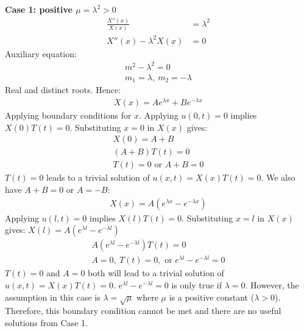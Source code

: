 \documentclass[11pt]{article}
\numberwithin{equation}{section}
\begin{document}
\textbf{Case 1: positive $\mu = \lambda^2 > 0$}
\begin{align}
	\frac{X''\left(x\right)}{X\left(x\right)} &= \lambda^2\\
	X''\left(x\right) - \lambda^2X\left(x\right) &= 0 
\end{align}
Auxiliary equation:
\begin{gather}
	m^2 - \lambda^2 = 0\\
	m_1 = \lambda, \ m_2 = -\lambda
\end{gather}
Real and distinct roots. Hence:
\begin{align}
	X(x) = Ae^{\lambda x} + Be^{-\lambda x}
\end{align}
Applying boundary conditions for $x$. Applying $u\left(0,t\right) = 0$ implies $X(0)T(t) = 0$. Substituting $x=0$ in $X(x)$ gives:
\begin{gather}
	X(0) = A + B\\
	\left(A+B\right)T(t) = 0\\
	T(t) = 0 \textrm{ or } A + B =0
\end{gather}
$T(t) = 0$ leads to a trivial solution of $u(x,t) = X(x)T(t) = 0$. We also have $A + B = 0$ or $A = - B$:
\begin{gather}
	X(x) = A\left(e^{\lambda x} - e^{-\lambda x}\right)
\end{gather}
Applying $u(l,t) = 0$ implies $X(l)T(t) = 0$. Substituting $x=l$ in $X(x)$ gives: $X(l) = A\left(e^{\lambda l} - e^{-\lambda l}\right)$
\begin{gather}
	A\left(e^{\lambda l} - e^{-\lambda l}\right)T(t) = 0\\
	A = 0, \ T(t) = 0, \textrm{ or } e^{\lambda l} - e^{-\lambda l} = 0
\end{gather}
$T(t) = 0$ and $A=0$ both will lead to a trivial solution of $u(x,t) = X(x)T(t) =0$. $e^{\lambda l} - e^{-\lambda l} = 0$ is only true if $\lambda = 0$. However, the assumption in this case is $\lambda = \sqrt{\mu}$ where $\mu$ is a positive constant ($\lambda > 0$). Therefore, this boundary condition cannot be met and there are no useful solutions from Case 1.
\end{document}
